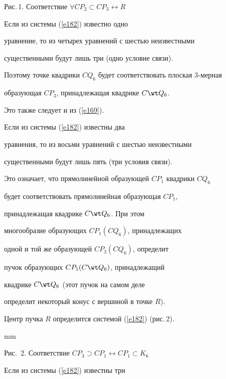 \vskip 120mm


\begin{center}


{Рис.\,1. Соответствие $\forall CP_2\subset CP_3\leftrightarrow R$}


\end{center}


\medskip


\noindent{}Если из системы (\ref{e182}) известно одно


уравнение, то из четырех уравнений с шестью неизвестными


существенными будут лишь три (одно условие связи).


Поэтому точке квадрики $CQ_6$ будет соответствовать плоская 3-мерная


образующая $CP_3$, принадлежащая квадрике $C\wt Q_6$.


Это также следует и из (\ref{e169}).


Если из системы (\ref{e182}) известны два


уравнения, то из восьми уравнений с шестью неизвестными


существенными будут лишь пять (три условия связи).


Это означает, что прямолинейной образующей $CP_1$ квадрики $CQ_6$


будет соответствовать прямолинейная образующая $CP_1$,


принадлежащая квадрике $C\wt Q_6$. При этом


многообразие образующих $CP_1(CQ_6)$, принадлежащих


одной и той же образующей $CP_3(CQ_6)$, определит


пучок образующих $CP_1(C\wt Q_6)$, принадлежащий


квадрике $C\wt Q_6$ (этот пучок на самом деле


определит некоторый конус с вершиной в точке $R$).


Центр пучка $R$ определится системой (\ref{e182}) (рис.\,2).


 mm


\begin{center}


{Рис.~2. Соответствие $CP_3\supset CP_1\leftrightarrow


CP_1\subset K_6$}


\end{center}


\medskip


\noindent{}Если из системы (\ref{e182}) известны три


